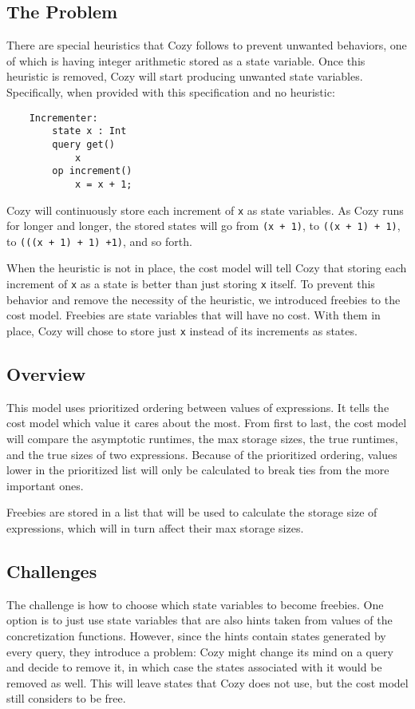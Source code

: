 \newcommand{\code}[1]{\texttt{#1}}

\subsection{The Problem}
There are special heuristics that Cozy follows to prevent unwanted behaviors,
one of which is having integer arithmetic stored as a state variable. Once this
heuristic is removed, Cozy will start producing unwanted state variables.
Specifically, when provided with this specification and no heuristic:

\begin{center}
\begin{lstlisting}
    Incrementer:
        state x : Int
        query get()
            x
        op increment()
            x = x + 1;
\end{lstlisting}
\end{center}

Cozy will continuously store each increment of \code{x} as state variables. As
Cozy runs for longer and longer, the stored states will go from \code{(x + 1)},
to \code{((x + 1) + 1)}, to \code{(((x + 1) + 1) +1)}, and so forth.

When the heuristic is not in place, the cost model will tell Cozy that storing
each increment of \code{x} as a state is better than just storing \code{x}
itself. To prevent this behavior and remove the necessity of the heuristic, we
introduced freebies to the cost model. Freebies are state variables that will
have no cost. With them in place, Cozy will chose to store just \code{x} instead
of its increments as states.

\subsection{Overview}
This model uses prioritized ordering between values of expressions. It tells the
cost model which value it cares about the most. From first to last, the cost
model will compare the asymptotic runtimes, the max storage sizes, the true
runtimes, and the true sizes of two expressions. Because of the prioritized
ordering, values lower in the prioritized list will only be calculated to break
ties from the more important ones. 

Freebies are stored in a list that will be used to calculate the storage size of
expressions, which will in turn affect their max storage sizes. 

\subsection{Challenges}
The challenge is how to choose which state variables to become freebies.
One option is to just use state variables that are also hints taken from values
of the concretization functions. However, since the hints contain states
generated by every query, they introduce a problem: Cozy might change its mind
on a query and decide to remove it, in which case the states associated with it
would be removed as well. This will leave states that Cozy does not use, but the
cost model still considers to be free.

